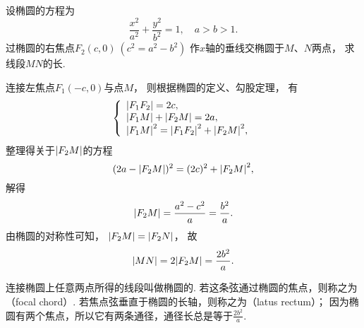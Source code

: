 \begin{example}
设椭圆的方程为\begin{equation*}
	\frac{x^2}{a^2}+\frac{y^2}{b^2}=1,
	\quad a>b>1.
\end{equation*}
过椭圆的右焦点\(F_2(c,0)\ (c^2=a^2-b^2)\)
作\(x\)轴的垂线交椭圆于\(M\)、\(N\)两点，
求线段\(MN\)的长.
\begin{solution}
连接左焦点\(F_1(-c,0)\)与点\(M\)，
则根据椭圆的定义、勾股定理，
有\begin{equation*}
	\left\{ \begin{array}{l}
		\abs{F_1 F_2} = 2c, \\
		\abs{F_1 M} + \abs{F_2 M} = 2a, \\
		\abs{F_1 M}^2 = \abs{F_1 F_2}^2 + \abs{F_2 M}^2,
	\end{array} \right.
\end{equation*}
整理得关于\(\abs{F_2 M}\)的方程\begin{equation*}
	(2a - \abs{F_2 M})^2 = (2c)^2 + \abs{F_2 M}^2,
\end{equation*}
解得\begin{equation*}
	\abs{F_2 M} = \frac{a^2 - c^2}{a} = \frac{b^2}{a}.
\end{equation*}
由椭圆的对称性可知，
\(\abs{F_2 M} = \abs{F_2 N}\)，
故\begin{equation*}
	\abs{MN} = 2\abs{F_2 M} = \frac{2 b^2}{a}.
\end{equation*}
\end{solution}

连接椭圆上任意两点所得的线段叫做椭圆的.
若这条弦通过椭圆的焦点，则称之为（focal chord）.
若焦点弦垂直于椭圆的长轴，则称之为（latus rectum）；
因为椭圆有两个焦点，所以它有两条通径，通径长总是等于\(\frac{2b^2}{a}\).
\end{example}

